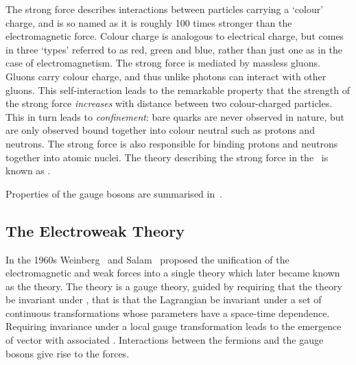 The strong force describes interactions between particles carrying a `colour'
charge, and is so named as it is roughly 100 times stronger than the electromagnetic
force. Colour charge is analogous to electrical charge, but comes in three
`types' referred to as red, green and blue, rather than just one as in
the case of electromagnetism. The strong force is mediated by massless gluons. Gluons carry
colour charge, and thus unlike photons can interact with other gluons. This
self-interaction leads to the remarkable property that the strength of the strong force {\it
increases} with distance between two colour-charged particles. This in turn leads to {\it
confinement}: bare quarks are never observed in nature, but are only observed
bound together into colour neutral  such as protons and neutrons. 
The strong force is also responsible for binding protons and neutrons together
into atomic nuclei. The theory describing the strong force in the \sm\ is known
as .

Properties of the gauge bosons are summarised in~.




\subsection{The Electroweak Theory}

In the 1960s Weinberg~\cite{PhysRevLett.19.1264} and Salam~\cite{Salam1964168} proposed the unification of the electromagnetic
and weak forces into a single theory which later became known as the
 theory. The theory is a gauge theory, guided by requiring that the theory be
invariant under , that is that the Lagrangian
be invariant under a set of continuous transformations whose parameters have a space-time dependence. 
Requiring invariance under a local gauge transformation leads to the emergence of
vector  with associated . Interactions
between the fermions and the gauge bosons give rise to the forces.

